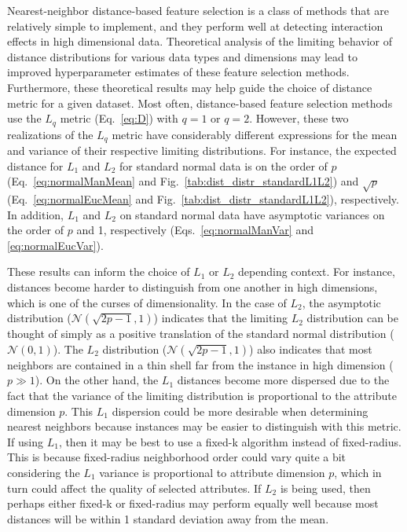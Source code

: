 \documentclass[10pt,letterpaper]{article}
\begin{document}
Nearest-neighbor distance-based feature selection is a class of methods that are relatively simple to implement, and they perform well at detecting interaction effects in high dimensional data. Theoretical analysis of the limiting behavior of distance distributions for various data types and dimensions may lead to improved hyperparameter estimates of these feature selection methods. Furthermore, these theoretical results may help guide the choice of distance metric for a given dataset. Most often, distance-based feature selection methods use the $L_q$ metric (Eq.~\ref{eq:D}) with $q=1$ or $q=2$. However, these two realizations of the $L_q$ metric have considerably different expressions for the mean and variance of their respective limiting distributions. For instance, the expected distance for $L_1$ and $L_2$ for standard normal data is on the order of $p$ (Eq.~\ref{eq:normalManMean} and Fig.~\ref{tab:dist_distr_standardL1L2}) and $\sqrt{p}$ (Eq.~\ref{eq:normalEucMean} and Fig.~\ref{tab:dist_distr_standardL1L2}), respectively. In addition, $L_1$ and $L_2$ on standard normal data have asymptotic variances on the order of $p$ and 1, respectively (Eqs.~\ref{eq:normalManVar} and \ref{eq:normalEucVar}). 

These results can inform the choice of $L_1$ or $L_2$ depending context. For instance, distances become harder to distinguish from one another in high dimensions, which is one of the curses of dimensionality. In the case of $L_2$, the asymptotic distribution ($\mathcal{N}(\sqrt{2p - 1},1)$) indicates that the limiting $L_2$ distribution can be thought of simply as a positive translation of the standard normal distribution ($\mathcal{N}(0,1)$). The $L_2$ distribution ($\mathcal{N}(\sqrt{2p - 1},1)$) also indicates that most neighbors are contained in a thin shell far from the instance in high dimension ($p \gg 1$). On the other hand, the $L_1$ distances become more dispersed due to the fact that the variance of the limiting distribution is proportional to the attribute dimension $p$. This $L_1$ dispersion could be more desirable when determining nearest neighbors because instances may be easier to distinguish with this metric. If using $L_1$, then it may be best to use a fixed-k algorithm instead of fixed-radius. This is because fixed-radius neighborhood order could vary quite a bit considering the $L_1$ variance is proportional to attribute dimension $p$, which in turn could affect the quality of selected attributes. If $L_2$ is being used, then perhaps either fixed-k or fixed-radius may perform equally well because most distances will be within 1 standard deviation away from the mean. 
\end{document}
